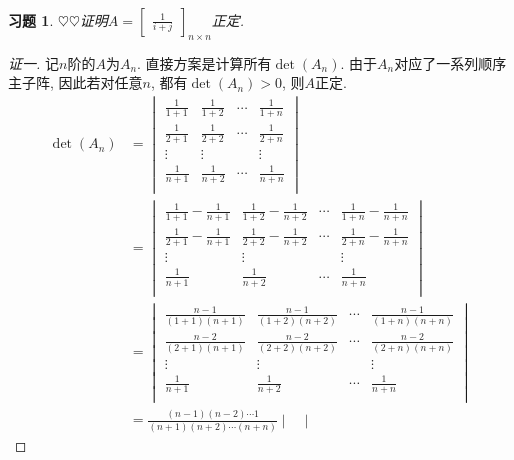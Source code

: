 \documentclass{ctexart}
\newtheorem{exercise}[thm]{习题}
\newcommand\hint[1]{\par {\footnotesize\kaishu 提示：#1}}
\def\hard{$\heartsuit$}
\def\dps{\displaystyle}
\newcommand{\diff}{\mathop{}\!\mathrm{d}}
\begin{document}
\begin{exercise}
\hard\hard 证明$A=\begin{bmatrix}
\frac{1}{i+j}
\end{bmatrix}_{n\times n}$正定. 

\end{exercise}
\begin{proof}[证一]
	记$n$阶的$A$为$A_n$. 
	直接方案是计算所有$\det(A_n)$. 由于$A_n$对应了一系列顺序主子阵, 因此若对任意$n$, 都有$\det(A_n)>0$, 则$A$正定. 
	\begin{align*}
		\det(A_n)&=\begin{vmatrix}
				\frac{1}{1+1} & \frac{1}{1+2} & \cdots & \frac{1}{1+n}\\
				\frac{1}{2+1} & \frac{1}{2+2} & \cdots & \frac{1}{2+n}\\
				\vdots &\vdots & &\vdots \\
				\frac{1}{n+1} & \frac{1}{n+2} & \cdots & \frac{1}{n+n}\\
			\end{vmatrix}
			\\&=\begin{vmatrix}
				\frac{1}{1+1}-\frac{1}{n+1} & \frac{1}{1+2}-\frac{1}{n+2} & \cdots & \frac{1}{1+n}-\frac{1}{n+n}\\
				\frac{1}{2+1}-\frac{1}{n+1} & \frac{1}{2+2}-\frac{1}{n+2} & \cdots & \frac{1}{2+n}-\frac{1}{n+n}\\
				\vdots &\vdots & &\vdots \\
				\frac{1}{n+1} & \frac{1}{n+2} & \cdots & \frac{1}{n+n}\\
			\end{vmatrix}
			\\&=\begin{vmatrix}
			\frac{n-1}{(1+1)(n+1)} & \frac{n-1}{(1+2)(n+2)} & \cdots & \frac{n-1}{(1+n)(n+n)}\\
			\frac{n-2}{(2+1)(n+1)} & \frac{n-2}{(2+2)(n+2)} & \cdots & \frac{n-2}{(2+n)(n+n)}\\
				\vdots &\vdots & &\vdots \\
				\frac{1}{n+1} & \frac{1}{n+2} & \cdots & \frac{1}{n+n}\\
				\end{vmatrix}
				\\&=\frac{(n-1)(n-2)\dotsm1}{(n+1)(n+2)\dotsm(n+n)}\begin{vmatrix}

\end{vmatrix}
\end{align*}
\end{proof}
\end{document}
